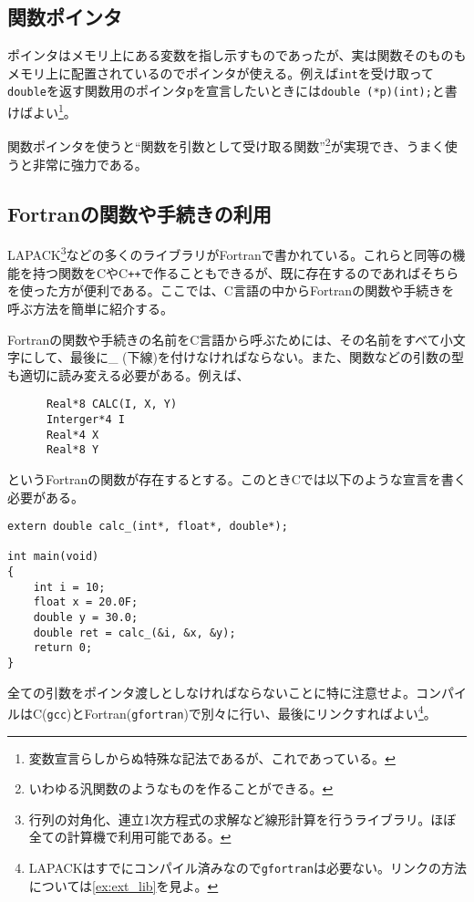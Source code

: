 \subsection{関数ポインタ}
ポインタはメモリ上にある変数を指し示すものであったが、実は関数そのものもメモリ上に配置されているのでポインタが使える。例えば\texttt{int}を受け取って\texttt{double}を返す関数用のポインタ\texttt{p}を宣言したいときには\texttt{double (*p)(int);}と書けばよい\footnote{変数宣言らしからぬ特殊な記法であるが、これであっている。}。

関数ポインタを使うと``関数を引数として受け取る関数''\footnote{いわゆる汎関数のようなものを作ることができる。}が実現でき、うまく使うと非常に強力である。

\subsection {Fortranの関数や手続きの利用}

LAPACK\footnote{行列の対角化、連立1次方程式の求解など線形計算を行うライブラリ。ほぼ全ての計算機で利用可能である。}などの多くのライブラリがFortranで書かれている。これらと同等の機能を持つ関数をCやC\texttt{++}で作ることもできるが、既に存在するのであればそちらを使った方が便利である。ここでは、C言語の中からFortranの関数や手続きを呼ぶ方法を簡単に紹介する。

Fortranの関数や手続きの名前をC言語から呼ぶためには、その名前をすべて小文字にして、最後に\_ (下線)を付けなければならない。また、関数などの引数の型も適切に読み変える必要がある。例えば、
\begin{reidai}\label{ex:fort}
    \begin{verbatim}
      Real*8 CALC(I, X, Y)
      Interger*4 I
      Real*4 X
      Real*8 Y
\end{verbatim}
\end{reidai} \noindent
というFortranの関数が存在するとする。このときCでは以下のような宣言を書く必要がある。
\begin{reidai}
    \begin{verbatim}
extern double calc_(int*, float*, double*);

int main(void)
{
    int i = 10;
    float x = 20.0F;
    double y = 30.0;
    double ret = calc_(&i, &x, &y);
    return 0;
}
\end{verbatim}
\end{reidai} \noindent
全ての引数をポインタ渡しとしなければならないことに特に注意せよ。コンパイルはC(\texttt{gcc})とFortran(\texttt{gfortran})で別々に行い、最後にリンクすればよい\footnote{LAPACKはすでにコンパイル済みなので\texttt{gfortran}は必要ない。リンクの方法については\ref{ex:ext_lib}を見よ。}。

